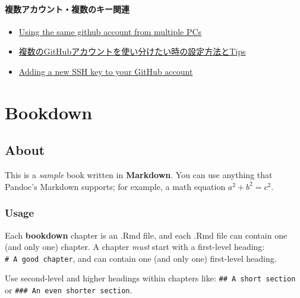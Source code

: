 \documentclass[
  xelatex, ja=standard]{bxjsbook}
\providecommand{\tightlist}{%
  \setlength{\itemsep}{0pt}\setlength{\parskip}{0pt}}
\theoremstyle{definition}
\theoremstyle{definition}
\theoremstyle{definition}
\theoremstyle{definition}
\theoremstyle{remark}
\begin{document}
\hypertarget{ux8907ux6570ux30a2ux30abux30a6ux30f3ux30c8ux8907ux6570ux306eux30adux30fcux95a2ux9023}{%
\subsubsection{複数アカウント・複数のキー関連}\label{ux8907ux6570ux30a2ux30abux30a6ux30f3ux30c8ux8907ux6570ux306eux30adux30fcux95a2ux9023}}

\begin{itemize}
\tightlist
\item
  \href{https://serverfault.com/questions/206907/using-the-same-github-account-from-multiple-pcs}{Using the same github account from multiple PCs}
\item
  \href{https://zenn.dev/taichifukumoto/articles/how-to-use-multiple-github-accounts}{複数のGitHubアカウントを使い分けたい時の設定方法とTips}
\item
  \href{https://docs.github.com/en/authentication/connecting-to-github-with-ssh/adding-a-new-ssh-key-to-your-github-account}{Adding a new SSH key to your GitHub account}
\end{itemize}

\hypertarget{bookdown-original}{%
\chapter{Bookdown}\label{bookdown-original}}

\hypertarget{about}{%
\section{About}\label{about}}

This is a \emph{sample} book written in \textbf{Markdown}. You can use anything that Pandoc's Markdown supports; for example, a math equation \(a^2 + b^2 = c^2\).

\hypertarget{usage}{%
\subsection{Usage}\label{usage}}

Each \textbf{bookdown} chapter is an .Rmd file, and each .Rmd file can contain one (and only one) chapter. A chapter \emph{must} start with a first-level heading: \texttt{\#\ A\ good\ chapter}, and can contain one (and only one) first-level heading.

Use second-level and higher headings within chapters like: \texttt{\#\#\ A\ short\ section} or \texttt{\#\#\#\ An\ even\ shorter\ section}.
\end{document}

